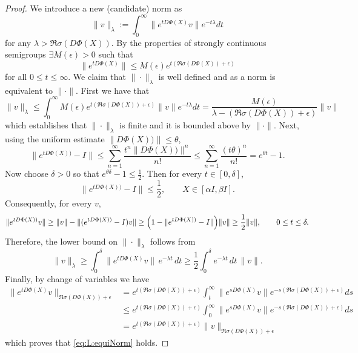 \documentclass[12pt,reqno]{amsart}
\begin{document}
\begin{proof}
We introduce a new (candidate) norm as
\begin{equation*}
\|v\|_{\lambda}:=\int_0^\infty\|e^{tD\Phi(X)}v\|e^{-t\lambda}dt
\end{equation*}
for any $\lambda>\Re\sigma(D\Phi(X))$. By the properties of strongly continuous semigroups \cite{DaleckiiKrein} $\exists M(\epsilon)>0$ such that
\begin{equation*}
\|e^{tD\Phi(X)}\|\leq M(\epsilon)e^{t(\Re\sigma(D\Phi(X))+\epsilon)}
\end{equation*}
for all $0\leq t\leq \infty$. We claim that $\|\cdot\|_{\lambda}$ is well defined and as a norm is equivalent to $\|\cdot\|$. First we have that
\begin{equation*}
\|v\|_{\lambda}\leq \int_0^\infty M(\epsilon)e^{t(\Re\sigma(D\Phi(X))+\epsilon)}\|v\|e^{-t\lambda}dt=\frac{M(\epsilon)}{\lambda-(\Re\sigma(D\Phi(X))+\epsilon)}\|v\|
\end{equation*}
which establishes that $\|\cdot\|_{\lambda}$ is finite and it is bounded above by $\|\cdot\|$.
Next, using the uniform estimate \(\|D\Phi(X))\|\le \theta\),
\[
\|e^{tD\Phi(X))}-I\|
\le
\sum_{n=1}^\infty \frac{t^n\|D\Phi(X))\|^n}{n!}
\le
\sum_{n=1}^\infty \frac{(t\theta)^n}{n!}
=
e^{\theta t}-1.
\]
Now choose \(\delta>0\) so that \(e^{\theta\delta}-1\le \frac12\). Then for every \(t\in[0,\delta]\),
\[
\|e^{tD\Phi(X))}-I\|\le \frac12,
\qquad X \in [\alpha I, \beta I].
\]
Consequently, for every \(v \),
\[
\|e^{tD\Phi(X))}v\|
\ge
\|v\|-\|(e^{tD\Phi(X))}-I)v\|
\ge
\Bigl(1-\|e^{tD\Phi(X))}-I\|\Bigr)\|v\|
\ge
\frac12\|v\|,
\qquad 0\le t\le \delta.
\]
Therefore, the lower bound on $\|\cdot\|_{\lambda}$ follows from
\[
\|v\|_{\lambda}
\ge
\int_0^\delta  \|e^{tD\Phi(X)}v\|\,e^{-\lambda t}\,dt
\ge
\frac12\int_0^\delta e^{-\lambda t}\,dt\,\|v\|.
\]
Finally, by change of variables we have
\begin{equation}\label{eq1:L:equiNorm}
\begin{split}
\|e^{tD\Phi(X)}v\|_{\Re\sigma(D\Phi(X))+\epsilon}&=e^{t(\Re\sigma(D\Phi(X))+\epsilon)}\int_t^\infty\|e^{sD\Phi(X)}v\|e^{-s(\Re\sigma(D\Phi(X))+\epsilon)}ds\\
&\leq e^{t(\Re\sigma(D\Phi(X))+\epsilon)}\int_0^\infty\|e^{sD\Phi(X)}v\|e^{-s(\Re\sigma(D\Phi(X))+\epsilon)}ds\\
&=e^{t(\Re\sigma(D\Phi(X))+\epsilon)}\|v\|_{\Re\sigma(D\Phi(X))+\epsilon}
\end{split}
\end{equation}
which proves that \eqref{eq:L:equiNorm} holds.
\end{proof}
\end{document}
